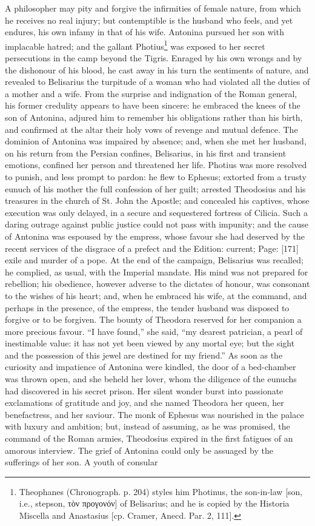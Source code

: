 A philosopher may pity and forgive the infirmities of female nature, from which he receives no real injury; but contemptible is the husband who feels, and yet endures, his own infamy in that of his wife. Antonina pursued her son with implacable hatred; and the gallant Photius\footnote{Theophanes (Chronograph. p. 204) styles him Photinus, the son-in-law [son, i.e., stepson, \textgreek{τ\texthebrew{ὸ}ν προγονόν}] of Belisarius; and he is copied by the Historia Miscella and Anastasius [cp. Cramer, Anecd. Par. 2, 111].} was exposed to her secret persecutions in the camp beyond the Tigris. Enraged by his own wrongs and by the dishonour of his blood, he cast away in his turn the sentiments of nature, and revealed to Belisarius the turpitude of a woman who had violated all the duties of a mother and a wife. From the surprise and indignation of the Roman general, his former credulity appears to have been sincere: he embraced the knees of the son of Antonina, adjured him to remember his obligations rather than his birth, and confirmed at the altar their holy vows of revenge and mutual defence. The dominion of Antonina was impaired by absence; and, when she met her husband, on his return from the Persian confines, Belisarius, in his first and transient emotions, confined her person and threatened her life. Photius was more resolved to punish, and less prompt to pardon: he flew to Ephesus; extorted from a trusty eunuch of his mother the full confession of her guilt; arrested Theodosius and his treasures in the church of St. John the Apostle; and concealed his captives, whose execution was only delayed, in a secure and sequestered fortress of Cilicia. Such a daring outrage against public justice could not pass with impunity; and the cause of Antonina was espoused by the empress, whose favour she had deserved by the recent services of the disgrace of a prefect and the Edition: current; Page: [171] exile and murder of a pope. At the end of the campaign, Belisarius was recalled; he complied, as usual, with the Imperial mandate. His mind was not prepared for rebellion; his obedience, however adverse to the dictates of honour, was consonant to the wishes of his heart; and, when he embraced his wife, at the command, and perhaps in the presence, of the empress, the tender husband was disposed to forgive or to be forgiven. The bounty of Theodora reserved for her companion a more precious favour. \texthebrew{“}I have found,\texthebrew{}” she said, \texthebrew{“}my dearest patrician, a pearl of inestimable value: it has not yet been viewed by any mortal eye; but the sight and the possession of this jewel are destined for my friend.\texthebrew{}” As soon as the curiosity and impatience of Antonina were kindled, the door of a bed-chamber was thrown open, and she beheld her lover, whom the diligence of the eunuchs had discovered in his secret prison. Her silent wonder burst into passionate exclamations of gratitude and joy, and she named Theodora her queen, her benefactress, and her saviour. The monk of Ephesus was nourished in the palace with luxury and ambition; but, instead of assuming, as he was promised, the command of the Roman armies, Theodosius expired in the first fatigues of an amorous interview. The grief of Antonina could only be assuaged by the sufferings of her son. A youth of consular 